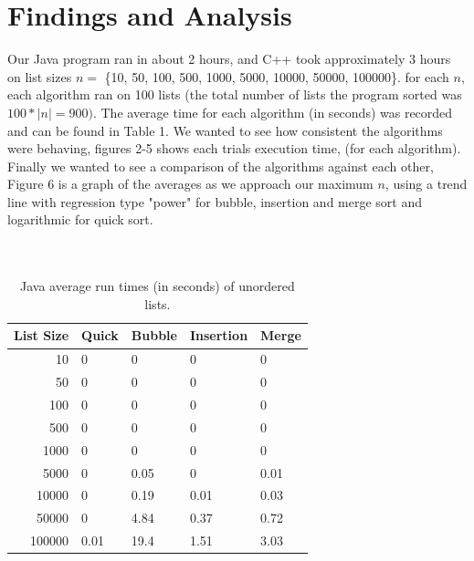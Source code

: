 \documentclass[12pt]{amsart}
\begin{document}
\section*{Findings and Analysis}
Our Java program ran in about 2 hours, and C++ took approximately 3 hours on list sizes $n = $ \{10, 50, 100, 500, 1000, 5000, 10000, 50000, 100000\}. for each $n$, each algorithm ran on 100 lists (the total number of lists the program sorted was $100 * |n| = 900)$. The average time for each algorithm (in seconds) was recorded and can be found in Table 1. We wanted to see how consistent the algorithms were behaving, figures 2-5 shows each trials execution time, (for each algorithm). Finally we wanted to see a comparison of the algorithms against each other, Figure 6 is a graph of the averages as we approach our maximum $n$, using a trend line with regression type "power" for bubble, insertion and merge sort and logarithmic for quick sort. 
\\ \\ \\
\begin{table}\footnotesize
\begin{center}
\begin{tabular}{ r | l l l l  }

List Size	&	Quick	&	Bubble	&	Insertion	&	Merge\\ \hline
10			&	0		&	0		&	0			&	0\\
50			&	0		&	0		&	0			&	0\\
100			&	0		&	0		&	0			&	0\\
500			&	0		&	0		&	0			&	0\\
1000			&	0		&	0		&	0			&	0\\
5000			&	0		&	0.05		&	0			&	0.01\\
10000		&	0		&	0.19		&	0.01			&	0.03\\
50000		&	0		&	4.84		&	0.37			&	0.72\\
100000		&	0.01		&	19.4		&	1.51			&	3.03\\

\end{tabular}
\end{center}
\caption{Java average run times (in seconds) of unordered lists.}
\end{table}
\end{document}
